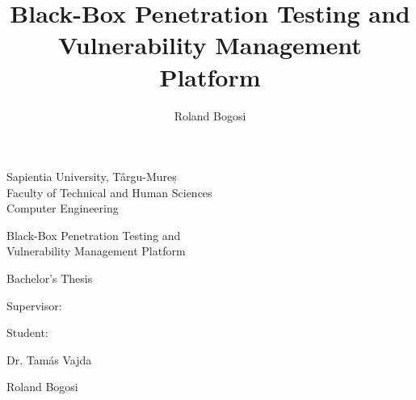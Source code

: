 \documentclass[a4paper,12pt]{article}
\author{Roland Bogosi}
\title{Black-Box Penetration Testing and Vulnerability Management Platform}
\begin{document}
%
%

\begingroup
	
\endgroup

\clearcontents

%
%

\begingroup
	
\endgroup

\clearcontents

%
%

\newpage
\pagestyle{empty}

	\begin{center}
		{\Large Sapientia University, Târgu-Mureș}\\\vspace{0.05in}
		{\Large Faculty of Technical and Human Sciences}\\\vspace{0.07in}
		{\Large Computer Engineering}\\
		
		\vspace{2.35in}
		
		{\huge Black-Box Penetration Testing and}\\\vspace{0.15in}
		{\huge Vulnerability Management Platform}
		
		\vspace{0.5in}
		
		{\LARGE Bachelor's Thesis}
		
	\end{center}
	
	\vspace{2.0in}
	
	\begin{multicols}{2}
		\begin{flushleft}
			{\Large Supervisor:}
		\end{flushleft}
		\columnbreak
		\begin{flushright}
			{\Large Student:}
		\end{flushright}
	\end{multicols}
	\begin{multicols}{2}
		\begin{flushleft}
			{\LARGE Dr. Tamás Vajda}
		\end{flushleft}
		\columnbreak
		\begin{flushright}
			{\LARGE Roland Bogosi}
		\end{flushright}
	\end{multicols}
	
\end{document}
